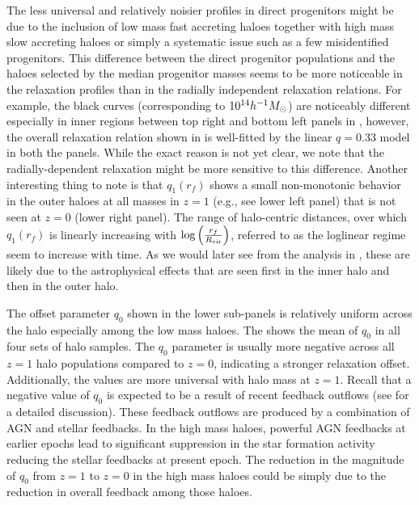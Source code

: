 The less universal and relatively noisier profiles in direct progenitors might be due to the inclusion of low mass fast accreting haloes together with high mass slow accreting haloes or simply a systematic issue such as a few misidentified progenitors. This difference between the direct progenitor populations and the haloes selected by the median progenitor masses seems to be more noticeable in the relaxation profiles than in the radially independent relaxation relations. For example, the black curves (corresponding to $10^{14} h^{-1}M_{\odot}$) are noticeably different especially in inner regions between top right and bottom left panels in , however, the overall relaxation relation shown in  is well-fitted by the linear $q=0.33$ model in both the panels. %
While the exact reason is not yet clear, we note that the radially-dependent relaxation might be more sensitive to this difference. 
Another interesting thing to note is that $q_1(r_f)$ shows a small non-monotonic behavior in the outer haloes at all masses in $z=1$ (e.g., see lower left panel) that is not seen at $z=0$ (lower right panel).
The range of halo-centric distances, over which $q_1(r_f)$ is linearly increasing with $\log \left( \frac{r_f}{R_{\rm{vir}}} \right) $, referred to as the loglinear regime seem to increase with time. As we would later see from the analysis in , these are likely due to the astrophysical effects that are seen first in the inner halo and then in the outer halo. %

The offset parameter $q_0$ shown in the lower sub-panels is relatively uniform across the halo especially among the low mass haloes. The  shows the mean of $q_0$ in all four sets of halo samples. The $q_0$ parameter is usually more negative across all $z=1$ halo populations compared to $z=0$, indicating a stronger relaxation offset. Additionally, the values are more universal with halo mass at $z=1$. Recall that a negative value of $q_0$ is expected to be a result of recent feedback outflows (see  for a detailed discussion). These feedback outflows are produced by a combination of AGN and stellar feedbacks. In the high mass haloes, powerful AGN feedbacks at earlier epochs lead to significant suppression in the star formation activity reducing the stellar feedbacks at present epoch. The reduction in the magnitude of $q_0$ from $z=1$ to $z=0$ in the high mass haloes could be simply due to the reduction in overall feedback among those haloes.
~%




